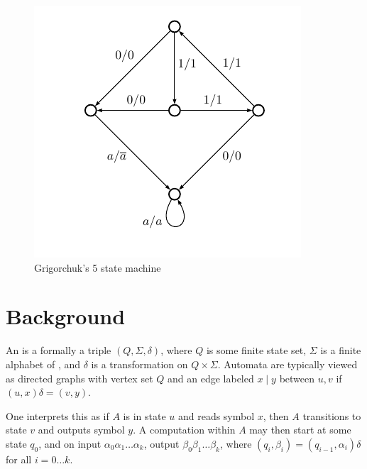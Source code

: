 \documentclass[10pt]{article}
\begin{document}
\begin{figure}
\begin{center}
\includegraphics[scale=0.5]{figures/grigorchuk}
\end{center}
\caption{Grigorchuk's 5 state machine}
\end{figure}
\section{Background}
An  is a formally a triple $(Q, \Sigma, \delta)$,
where $Q$ is some finite state set, $\Sigma$ is a finite alphabet of
, and $\delta$ is a transformation on $Q \times \Sigma$.
Automata are typically viewed as directed graphs with vertex set $Q$
and an edge labeled $x \mid y$ between $u, v$ if $(u, x)\delta = (v, y)$.

\begin{center}
\end{center}

One interprets this as if $A$ is in state $u$ and reads symbol $x$,
then $A$ transitions to state $v$ and outputs symbol $y$. A
computation within $A$ may then start at some state $q_0$, and on
input $\alpha_0 \alpha_1 \ldots \alpha_k$, output
$\beta_0 \beta_1 \ldots \beta_k$, where
$(q_i, \beta_i) = (q_{i-1}, \alpha_i)\delta$ for all $i = 0\ldots k$.
\end{document}
